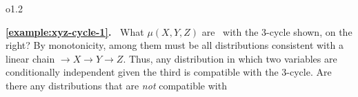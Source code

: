 \settowidth{\cycleboxlen}{\usebox{\cyclebox}}
\begin{wrapfigure}[4]{o}{1.2\cycleboxlen}
\end{wrapfigure}
\textbf{\cref{example:xyz-cycle-1}.~} 
    What
    $\mu(X,Y,Z)$
    are \cible\ 
    with 
    the 3-cycle shown, on the right?
    By monotonicity,
    among them must be all distributions consistent with a linear chain ${\to}X{\to}Y{\to}Z$. Thus,  
        any distribution
    in which two variables are conditionally independent given the third
    is compatible with 
    the 3-cycle.
    Are there any distributions that are \emph{not} compatible with 
